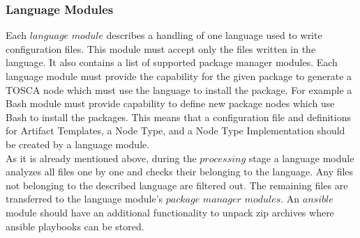 \subsubsection{Language Modules} \label{subs:archlm}
Each $language$ $module$ describes a handling of one language used to write configuration files.
This module must accept only the files written in the language.
It also contains a list of supported package manager modules.
Each language module must provide the capability for the given package to generate a TOSCA node which must use the language to install the package.
For example a Bash module must provide capability to define new package nodes which use Bash to install the packages.
This means that a configuration file and definitions for Artifact Templates, a Node Type, and a Node Type Implementation should be created by a language module.\\
As it is already mentioned above, during the $processing$ stage a language module analyzes all files one by one and checks their belonging to the language. 
Any files not belonging to the described language are filtered out.
The remaining files are transferred to the language module's $package$ $manager$ $modules$.
An $ansible$ module should have an additional functionality to unpack zip archives where ansible playbooks can be stored.

